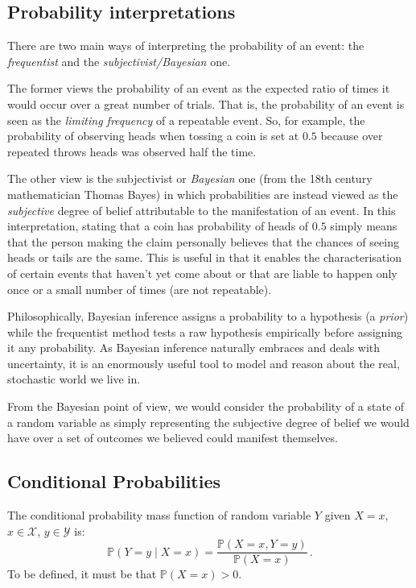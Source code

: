 \subsection{Probability interpretations} \label{subsec:probability-interpretations}
There are two main ways of interpreting the probability of an event: the \textit{frequentist} and the \textit{subjectivist/Bayesian} one.

The former views the probability of an event as the expected ratio of times it would occur over a great number of trials.
That is, the probability of an event is seen as the \textit{limiting frequency} of a repeatable event.
So, for example, the probability of observing heads when tossing a coin is set at $0.5$ because over repeated throws heads was observed half the time.

The other view is the subjectivist or \textit{Bayesian} one (from the 18th century mathematician Thomas Bayes) in which probabilities are instead viewed as the \textit{subjective} degree of belief attributable to the manifestation of an event.
In this interpretation, stating that a coin has probability of heads of $0.5$ simply means that the person making the claim personally believes that the chances of seeing heads or tails are the same.
This is useful in that it enables the characterisation of certain events that haven't yet come about or that are liable to happen only once or a small number of times (are not repeatable).

Philosophically, Bayesian inference assigns a probability to a hypothesis (a \textit{prior}) while the frequentist method tests a raw hypothesis empirically before assigning it any probability.
As Bayesian inference naturally embraces and deals with uncertainty, it is an enormously useful tool to model and reason about the real, stochastic world we live in.

From the Bayesian point of view, we would consider the probability of a state of a random variable as simply representing the subjective degree of belief we would have over a set of outcomes we believed could manifest themselves.

\subsection{Conditional Probabilities} \label{subsec:conditional-probabilities}
\begin{definition} \label{def:conditional-probability}
	The conditional probability mass function of random variable $Y$ given $X=x$, $x \in \mathcal{X}$, $y \in \mathcal{Y}$ is:
\begin{equation*}
\mathbb{P}(Y=y \mid X=x) = \frac{\mathbb{P}(X=x,Y=y)}{\mathbb{P}(X=x)} \,.
\end{equation*}
To be defined, it must be that $\mathbb{P}(X=x) > 0$.
\end{definition}

